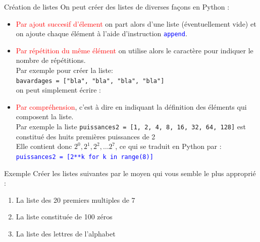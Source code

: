 \documentclass[10pt]{beamer}
\begin{document}
\begin{frame}
	\mframe{\Python}
	\begin{alertblock}{Création de listes}
		On peut créer des listes de diverses façons en Python :
		\begin{itemize}
			\item<2-> \textcolor{red}{Par ajout succesif d'élement} on part alors d'une liste (éventuellement vide) et on ajoute chaque élément à l'aide d'instruction \textcolor{blue}{\tt append}.
			\item<3-> \textcolor{red}{Par répétition du même élément} on utilise alors le caractère \textcolor{blue}{\tt *} pour indiquer le nombre de répétitions. \\
			      \onslide<4-> {Par exemple pour créer la liste: \\ {\tt bavardages = ["bla", "bla", "bla", "bla"]} \\ on peut simplement écrire : \\}
			      \onslide<5->{\textcolor{blue}{\tt bavardages = ["bla"]*4}}
			\item<6->	 \textcolor{red}{Par compréhension}, c'est à dire en indiquant la définition des éléments qui composent la liste. \\
			      \onslide<7-> {Par exemple la liste {\tt puissances2 = [1, 2, 4, 8, 16, 32, 64, 128]} est constitué des huits premières puissances de 2} \\
			      \onslide<8-> {Elle contient donc $2^0, 2^1, 2^2, \dots 2^7$, ce qui se traduit en Python par :}\\
			      \onslide<9-> \textcolor{blue}{\tt puissances2 = [2**k for k in range(8)]}
		\end{itemize}
	\end{alertblock}
\end{frame}

\begin{frame}
	\mframe{\Python}
	\begin{exampleblock}{Exemple}
		Créer les listes suivantes par le moyen qui vous semble le plus approprié :
		\begin{enumerate}
			\item<1-> La liste des 20 premiers multiples de 7
			\item<2-> La liste constituée de 100 zéros
			\item<3-> La liste des lettres de l'alphabet
		\end{enumerate}
	\end{exampleblock}
\end{frame}
\end{document}
